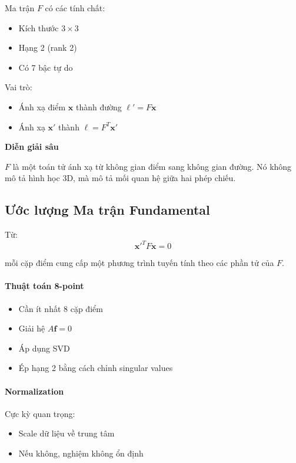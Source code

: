 Ma trận $F$ có các tính chất:

\begin{itemize}
	\item Kích thước $3 \times 3$
	\item Hạng 2 (rank 2)
	\item Có 7 bậc tự do
\end{itemize}

Vai trò:

\begin{itemize}
	\item Ánh xạ điểm $\mathbf{x}$ thành đường $\ell' = F\mathbf{x}$
	\item Ánh xạ $\mathbf{x}'$ thành $\ell = F^T \mathbf{x}'$
\end{itemize}

\begin{mdframed}[style=infobox]
	\textbf{Diễn giải sâu}
	
	$F$ là một toán tử ánh xạ từ không gian điểm sang không gian đường. Nó không mô tả hình học 3D, mà mô tả mối quan hệ giữa hai phép chiếu.
\end{mdframed}

\subsection{Ước lượng Ma trận Fundamental}
\label{subsec:estimate_F}

Từ:
\[
\mathbf{x}'^T F \mathbf{x} = 0
\]

mỗi cặp điểm cung cấp một phương trình tuyến tính theo các phần tử của $F$.

\paragraph{Thuật toán 8-point}

\begin{itemize}
	\item Cần ít nhất 8 cặp điểm
	\item Giải hệ $A\mathbf{f} = 0$
	\item Áp dụng SVD
	\item Ép hạng 2 bằng cách chỉnh singular values
\end{itemize}

\paragraph{Normalization}

Cực kỳ quan trọng:
\begin{itemize}
	\item Scale dữ liệu về trung tâm
	\item Nếu không, nghiệm không ổn định
\end{itemize}

